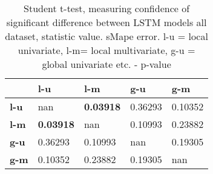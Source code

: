 \begin{table}[h]
\centering
\caption{Student t-test, measuring confidence of significant difference between LSTM models all dataset, statistic value. sMape error.  l-u = local univariate, l-m= local multivariate, g-u = global univariate etc. - p-value}
\label{table:ttest-p-values-lstm-experiments-sMAPE-all-dataset}
\begin{tabular}{lllll}
\toprule
{} &               l-u &               l-m &      g-u &      g-m \\
\midrule
\textbf{l-u} &               nan &  \textbf{0.03918} &  0.36293 &  0.10352 \\
\textbf{l-m} &  \textbf{0.03918} &               nan &  0.10993 &  0.23882 \\
\textbf{g-u} &           0.36293 &           0.10993 &      nan &  0.19305 \\
\textbf{g-m} &           0.10352 &           0.23882 &  0.19305 &      nan \\
\bottomrule
\end{tabular}
\end{table}

